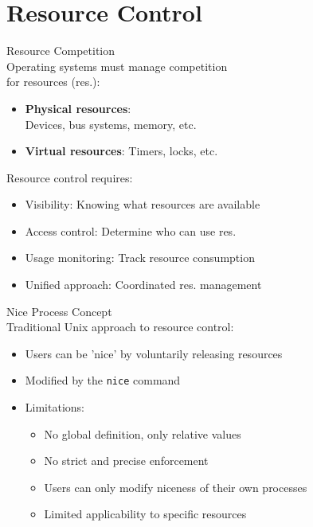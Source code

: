 \section{Resource Control}


\begin{concept}{Resource Competition}\\
    Operating systems must manage competition\\ for resources (res.):
    \begin{itemize}
        \item \textbf{Physical resources}: \\ Devices, bus systems, memory, etc.
        \item \textbf{Virtual resources}: Timers, locks, etc.
    \end{itemize}
    
    Resource control requires:
    \begin{itemize}
        \item Visibility: Knowing what resources are available
        \item Access control: Determine who can use res.
        \item Usage monitoring: Track resource consumption
        \item Unified approach: Coordinated res. management
    \end{itemize}
\end{concept}

\begin{definition}{Nice Process Concept}\\
    Traditional Unix approach to resource control:
    \begin{itemize}
        \item Users can be 'nice' by voluntarily releasing resources
        \item Modified by the \texttt{nice} command
        \item Limitations:
            \begin{itemize}
                \item No global definition, only relative values
                \item No strict and precise enforcement
                \item Users can only modify niceness of their own processes
                \item Limited applicability to specific resources
            \end{itemize}
    \end{itemize}
\end{definition}

